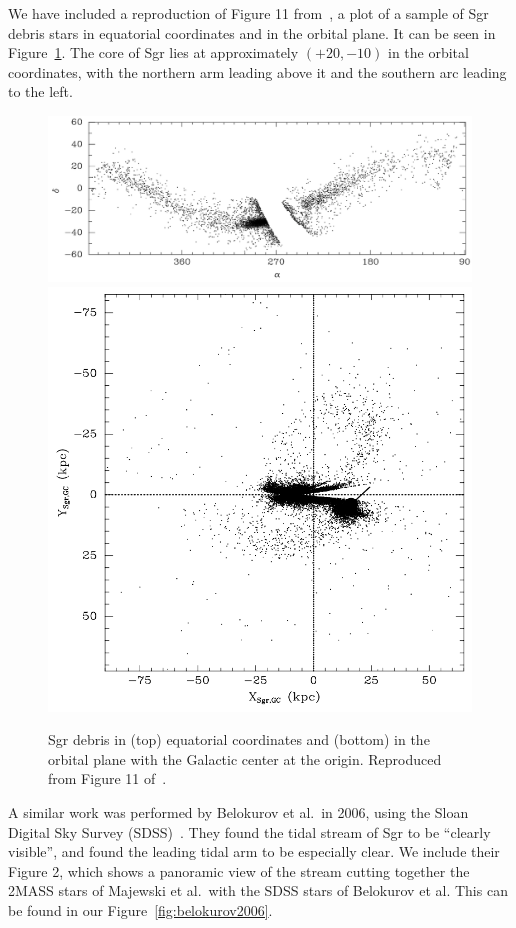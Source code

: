We have included a reproduction of Figure 11 from~\cite{majewski_two_2003}, a
plot of a sample of Sgr debris stars in equatorial coordinates and in the
orbital plane. It can be seen in Figure~\ref{fig:majewski}. The core of Sgr
lies at approximately $(+20, -10)$ in the orbital coordinates, with the
northern arm leading above it and the southern arc leading to the left.

\begin{figure}
    \centering 
    \includegraphics[width=0.7\linewidth]{figs/majewski2003-12.png}
    \includegraphics[width=0.45\linewidth]{figs/majewski2003-11.png}
    \caption{%
        Sgr debris in (top) equatorial coordinates and (bottom) in the orbital
        plane with the Galactic center at the origin. Reproduced from Figure
        11 of~\cite{majewski_two_2003}.
    }
    \label{fig:majewski}
\end{figure}

A similar work was performed by Belokurov et al.~in 2006, using the Sloan
Digital Sky Survey (SDSS)~\cite{belokurov_field_2006}. They found the tidal
stream of Sgr to be ``clearly visible'', and found the leading tidal arm to be
especially clear. We include their Figure 2, which shows a panoramic view of
the stream cutting together the 2MASS stars of Majewski et al.~with the SDSS
stars of Belokurov et al. This can be found in our
Figure~\ref{fig:belokurov2006}.

